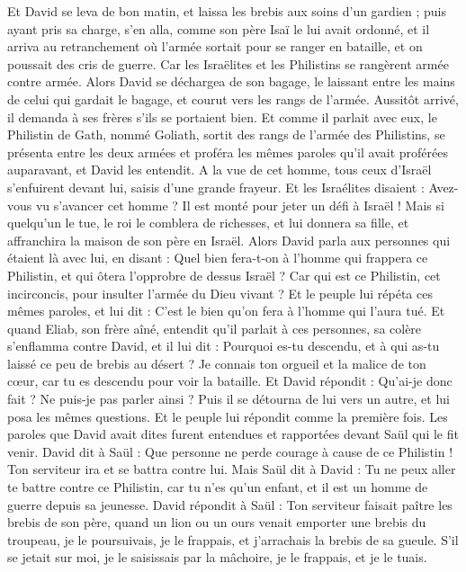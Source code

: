 \begin{multicols}{2}
Et David se leva de bon matin, et laissa les brebis aux soins d'un gardien ; puis ayant pris sa charge, s'en alla, comme son père Isaï le lui avait ordonné, et il arriva au retranchement où l'armée sortait pour se ranger en bataille, et on poussait des cris de guerre.
Car les Israëlites et les Philistins se rangèrent armée contre armée.
Alors David se déchargea de son bagage, le laissant entre les mains de celui qui gardait le bagage, et courut vers les rangs de l'armée. Aussitôt arrivé, il demanda à ses frères s'ils se portaient bien.
Et comme il parlait avec eux, le Philistin de Gath, nommé Goliath, sortit des rangs de l'armée des Philistins, se présenta entre les deux armées et proféra les mêmes paroles qu'il avait proférées auparavant, et David les entendit.
A la vue de cet homme, tous ceux d'Israël s'enfuirent devant lui, saisis d'une grande frayeur.
Et les Israélites disaient : Avez-vous vu s'avancer cet homme ? Il est monté pour jeter un défi à Israël ! Mais si quelqu'un le tue, le roi le comblera de richesses, et lui donnera sa fille, et affranchira la maison de son père en Israël.
Alors David parla aux personnes qui étaient là avec lui, en disant : Quel bien fera-t-on à l'homme qui frappera ce Philistin, et qui ôtera l'opprobre de dessus Israël ? Car qui est ce Philistin, cet incirconcis, pour insulter l'armée du Dieu vivant ?
Et le peuple lui répéta ces mêmes paroles, et lui dit : C'est le bien qu'on fera à l'homme qui l'aura tué.
Et quand Eliab, son frère aîné, entendit qu'il parlait à ces personnes, sa colère s'enflamma contre David, et il lui dit : Pourquoi es-tu descendu, et à qui as-tu laissé ce peu de brebis au désert ? Je connais ton orgueil et la malice de ton cœur, car tu es descendu pour voir la bataille.
Et David répondit : Qu'ai-je donc fait ? Ne puis-je pas parler ainsi ?
Puis il se détourna de lui vers un autre, et lui posa les mêmes questions. Et le peuple lui répondit comme la première fois.
Les paroles que David avait dites furent entendues et rapportées devant Saül qui le fit venir.
David dit à Saül : Que personne ne perde courage à cause de ce Philistin ! Ton serviteur ira et se battra contre lui.
Mais Saül dit à David : Tu ne peux aller te battre contre ce Philistin, car tu n'es qu'un enfant, et il est un homme de guerre depuis sa jeunesse.
David répondit à Saül : Ton serviteur faisait paître les brebis de son père, quand un lion ou un ours venait emporter une brebis du troupeau,
je le poursuivais, je le frappais, et j'arrachais la brebis de sa gueule. S'il se jetait sur moi, je le saisissais par la mâchoire, je le frappais, et je le tuais.

\end{multicols}
